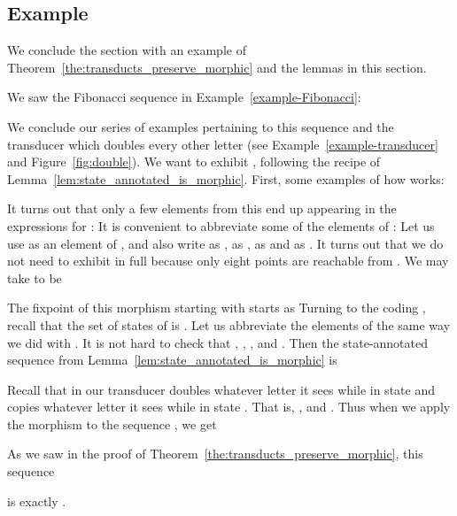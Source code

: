 \subsection{Example}

We conclude the section with an example of Theorem~\ref{the:transducts_preserve_morphic}
and the lemmas in this section.

\begin{example}[]
  We saw the Fibonacci sequence  in Example~\ref{example-Fibonacci}:
  
  We conclude our series of examples pertaining to this sequence
  and the transducer 
  which doubles every other letter (see Example~\ref{example-transducer} and Figure~\ref{fig:double}).
  We want to exhibit ,
  following the recipe of Lemma~\ref{lem:state_annotated_is_morphic}.  First,  some examples of how  works:
  

  It turns out that only a few elements from this  end up appearing in the expressions for
  : 
  It is convenient to abbreviate some of the elements of :  
  Let us use  as an element of , and  also
  write 
   as , 
   as ,
   as 
  and  as .
  It turns out that we do not need to exhibit  in full because only eight points are reachable
  from .
  We may take  to be 
  

  The fixpoint of this morphism starting with  starts as 
  Turning to the coding , recall that the set  of states of  is . 
  Let us abbreviate the elements of  the same way we did
  with .   
  It is not hard to check that , ,   
  , and
  .
  Then the state-annotated
  sequence  from Lemma~\ref{lem:state_annotated_is_morphic} is
  


  Recall that  
  in our transducer doubles whatever letter it sees while in state  and copies whatever letter it sees while in state .
  That is, , and .
  Thus when we apply the morphism  to the sequence , we get
  
  As we saw in the proof of Theorem~\ref{the:transducts_preserve_morphic}, this
  sequence 
  
  is exactly .  
\end{example}
